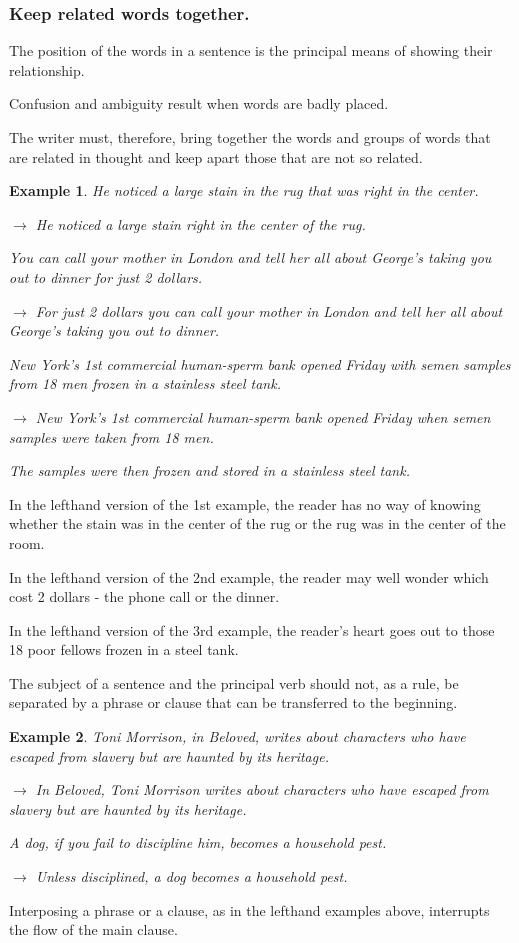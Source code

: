\documentclass{article}
\newtheorem{example}{Example}
\begin{document}
\subsubsection{Keep related words together.}
The position of the words in a sentence is the principal means of showing their relationship.

Confusion and ambiguity result when words are badly placed.

The writer must, therefore, bring together the words and groups of words that are related in thought and keep apart those that are not so related.
\begin{example}
	He noticed a large stain in the rug that was right in the center.
	
	$\to$ He noticed a large stain right in the center of the rug.
	
	You can call your mother in London and tell her all about George's taking you out to dinner for just 2 dollars.
	
	$\to$ For just 2 dollars you can call your mother in London and tell her all about George's taking you out to dinner.
	
	New York's 1st commercial human-sperm bank opened Friday with semen samples from 18 men frozen in a stainless steel tank.
	
	$\to$ New York's 1st commercial human-sperm bank opened Friday when semen samples were taken from 18 men.
	
	The samples were then frozen and stored in a stainless steel tank.
\end{example}
In the lefthand version of the 1st example, the reader has no way of knowing whether the stain was in the center of the rug or the rug was in the center of the room.

In the lefthand version of the 2nd example, the reader may well wonder which cost 2 dollars - the phone call or the dinner.

In the lefthand version of the 3rd example, the reader's heart goes out to those 18 poor fellows frozen in a steel tank.

%
The subject of a sentence and the principal verb should not, as a rule, be separated by a phrase or clause that can be transferred to the beginning.
\begin{example}
	Toni Morrison, in \emph{Beloved}, writes about characters who have escaped from slavery but are haunted by its heritage.
	
	$\to$ In \emph{Beloved}, Toni Morrison writes about characters who have escaped from slavery but are haunted by its heritage.
	
	A dog, if you fail to discipline him, becomes a household pest.
	
	$\to$ Unless disciplined, a dog becomes a household pest.
\end{example}
Interposing a phrase or a clause, as in the lefthand examples above, interrupts the flow of the main clause.
\end{document}
